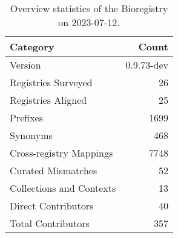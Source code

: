\begin{table}
\caption{Overview statistics of the Bioregistry on 2023-07-12.}
\label{tab:bioregistry-summary}
\begin{tabular}{lr}
\toprule
Category & Count \\
\midrule
Version & 0.9.73-dev \\
Registries Surveyed & 26 \\
Registries Aligned & 25 \\
Prefixes & 1699 \\
Synonyms & 468 \\
Cross-registry Mappings & 7748 \\
Curated Mismatches & 52 \\
Collections and Contexts & 13 \\
Direct Contributors & 40 \\
Total Contributors & 357 \\
\bottomrule
\end{tabular}
\end{table}
